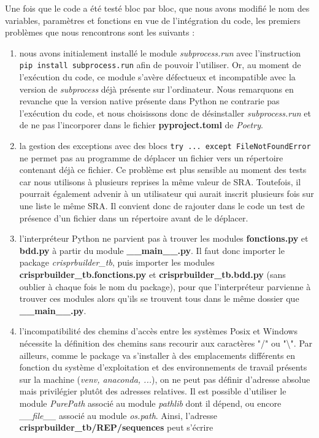 \documentclass[twoside,a4paper,11pt,frenchb,openany]{report}
\begin{document}
Une fois que le code a été testé bloc par bloc, que nous avons modifié le nom des variables, paramètres et fonctions en vue de l'intégration du code, les premiers problèmes que nous rencontrons sont les suivants :  
\begin{enumerate}
\item nous avons initialement installé le module \textit{subprocess.run} avec l'instruction \\\texttt{pip install subprocess.run} afin de pouvoir l'utiliser. Or, au moment de l'exécution du code, ce module s'avère défectueux et incompatible avec la version de \textit{subprocess} déjà présente sur l'ordinateur. Nous remarquons en revanche que la version native présente dans Python ne contrarie pas l'exécution du code, et nous choisissons donc de désinstaller \textit{subprocess.run} et de ne pas l'incorporer dans le fichier \textbf{pyproject.toml} de \textit{Poetry}.
\item la gestion des exceptions avec des blocs \texttt{try ... except FileNotFoundError} ne permet pas au programme de déplacer un fichier vers un répertoire contenant déjà ce fichier. Ce problème est plus sensible au moment des tests car nous utilisons à plusieurs reprises la même valeur de SRA. Toutefois, il pourrait également advenir à un utilisateur qui aurait inscrit plusieurs fois sur une liste le même SRA. Il convient donc de rajouter dans le code un test de présence d'un fichier dans un répertoire avant de le déplacer.
\item l'interpréteur Python ne parvient pas à trouver les modules \textbf{fonctions.py} et \textbf{bdd.py} à partir du module \textbf{\_\_main\_\_.py}. Il faut donc importer le package \textit{crisprbuilder\_tb}, puis importer les modules \textbf{crisprbuilder\_tb.fonctions.py} et \textbf{crisprbuilder\_tb.bdd.py} (sans oublier à chaque fois le nom du package), pour que l'interpréteur parvienne à trouver ces modules alors qu'ils se trouvent tous dans le même dossier que \textbf{\_\_main\_\_.py}.
\item l'incompatibilité des chemins d'accès entre les systèmes Posix et Windows nécessite la définition des chemins sans recourir aux caractères "/" ou "\textbackslash". Par ailleurs, comme le package va s'installer à des emplacements différents en fonction du système d'exploitation et des environnements de travail présents sur la machine (\textit{venv, anaconda, ...}), on ne peut pas définir d'adresse absolue mais privilégier plutôt des adresses relatives. Il est possible d'utiliser le module \textit{PurePath} associé au module \textit{pathlib} dont il dépend, ou encore \textit{\_\_file\_\_} associé au module \textit{os.path}. Ainsi, l'adresse  \textbf{crisprbuilder\_tb/REP/sequences} peut s'écrire

\end{enumerate}
\end{document}
